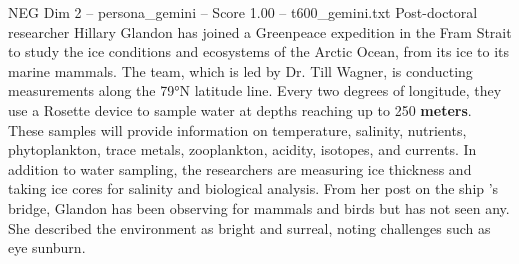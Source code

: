 \begin{textsample}{NEG Dim 2 – persona\_gemini – Score 1.00 – t600\_gemini.txt}  \label{ex:f2_neg_017}
Post-doctoral researcher Hillary Glandon has joined a Greenpeace expedition in the Fram Strait to study the ice conditions and ecosystems of the Arctic Ocean, from its ice to its marine mammals.
The team, which is led by Dr.
Till Wagner, is conducting measurements along the 79°N latitude line.
Every two degrees of longitude, they use a Rosette device to sample water at depths reaching up to 250 \textbf{meters}.
These samples will provide information on temperature, salinity, nutrients, phytoplankton, trace metals, zooplankton, acidity, isotopes, and currents.
In addition to water sampling, the researchers are measuring ice thickness and taking ice cores for salinity and biological analysis.
From her post on the ship 's bridge, Glandon has been observing for mammals and birds but has not seen any.
She described the environment as bright and surreal, noting challenges such as eye sunburn.

\end{textsample}
